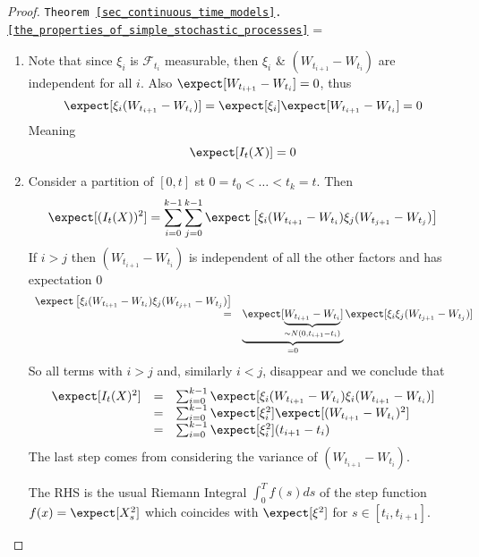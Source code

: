\documentclass[11pt,a4paper]{article}
\begin{document}
  \begin{proof}{\texttt{Theorem \ref{sec_continuous_time_models}.\ref{the_properties_of_simple_stochastic_processes}}}
    \everymath={\displaystyle}
    \begin{enumerate}
      \item Note that since $\xi_i$ is $\mathcal{F}_{t_i}$ measurable, then $\xi_i$ \& $(W_{t_{i+1}}-W_{t_i})$ are independent for all $i$. Also $\expect[W_{t_{i+1}}-W_{t_i}]=0$, thus
      \[ \expect[\xi_i(W_{t_{i+1}}-W_{t_i})]=\expect[\xi_i]\expect[W_{t_{i+1}}-W_{t_i}]=0 \]
      Meaning
      \[ \expect[I_t(X)]=0 \]

      \item Consider a partition of $[0,t]$ st $0=t_0<\dots<t_k=t$. Then
      \[ \expect[(I_t(X))^2]=\sum_{i=0}^{k-1}\sum_{j=0}^{k-1}\expect\left[\xi_i(W_{t_{i+1}}-W_{t_i})\xi_j(W_{t_{j+1}}-W_{t_j})\right] \]
      If $i>j$ then $(W_{t_{i+1}}-W_{t_i})$ is independent of all the other factors and has expectation 0
      \[\begin{array}{rl}
        \expect\left[\xi_i(W_{t_{i+1}}-W_{t_i})\xi_j(W_{t_{j+1}}-W_{t_j})\right]\\
        =&\underbrace{\expect[\underbrace{W_{t_{i+1}}-W_{t_i}}_{\sim N(0,t_{i+1}-t_i)}]}_{=0}\expect[\xi_i\xi_j(W_{t_{j+1}}-W_{t_j})]
      \end{array}\]
      So all terms with $i>j$ and, similarly $i<j$, disappear and we conclude that
      \[\begin{array}{rcl}
        \expect[I_t(X)^2]&=&\sum_{i=0}^{k-1}\expect[\xi_i(W_{t_{i+1}}-W_{t_i})\xi_i(W_{t_{i+1}}-W_{t_i})]\\
        &=&\sum_{i=0}^{k-1}\expect[\xi_i^2]\expect[(W_{t_{i+1}}-W_{t_i})^2]\\
        &=&\sum_{i=0}^{k-1}\expect[\xi_i^2](t_{i+1}-t_i)
      \end{array}\]
      The last step comes from considering the variance of $(W_{t_{i+1}}-W_{t_i})$.
      \par The RHS is the usual Riemann Integral $\int_0^Tf(s)ds$ of the step function $f(x)=\expect[X_s^2]$ which coincides with $\expect[\xi^2]$ for $s\in[t_i,t_{i+1}]$.


\end{enumerate}
\end{proof}
\end{document}
